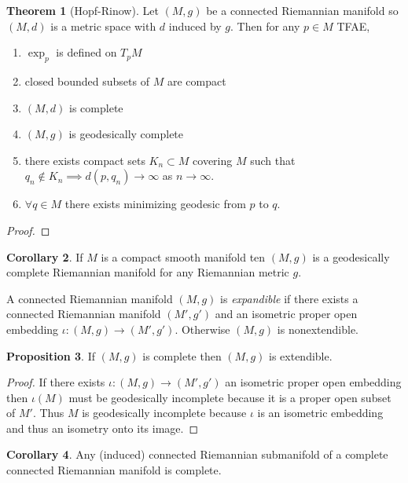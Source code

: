 \documentclass[12pt]{extarticle}
\theoremstyle{definition}
\newtheorem{theorem}{Theorem}[section]
\newtheorem{proposition}[theorem]{Proposition}
\newtheorem{corollary}[theorem]{Corollary}
\newenvironment{definition}[1][Definition:]{\begin{trivlist}
\item[\hskip \labelsep {\bfseries #1}]}{\end{trivlist}}
\begin{document}
\begin{theorem}[Hopf-Rinow]
Let $(M, g)$ be a connected Riemannian manifold so $(M, d)$ is a metric space with $d$ induced by $g$. Then for any $p \in M$ TFAE,
\begin{enumerate}
\item $\exp_p$  is defined on $T_p M$ 
\item closed bounded subsets of $M$ are compact
\item $(M, d)$ is complete
\item $(M, g)$ is geodesically  complete
\item there exists compact sets $K_n \subset M$ covering $M$ such that $q_n \notin K_n \implies d(p, q_n) \to \infty$ as $n \to \infty$.
\item $\forall q \in M$ there exists minimizing geodesic from $p$ to $q$.
\end{enumerate}
\end{theorem}

\begin{proof}

\end{proof}

\begin{corollary}
If $M$ is a compact smooth manifold ten $(M, g)$ is a geodesically complete Riemannian manifold for any Riemannian metric $g$. 
\end{corollary}

\begin{definition}
A connected Riemannian manifold $(M, g)$ is \textit{expandible} if there exists a connected Riemannian manifold $(M', g')$ and an isometric proper open embedding $\iota : (M, g) \to (M', g')$. Otherwise $(M, g)$ is nonextendible.  
\end{definition}

\begin{proposition}
If $(M, g)$ is complete then $(M, g)$ is extendible.
\end{proposition}

\begin{proof}
If there exists $\iota : (M, g) \to (M', g')$ an isometric proper open embedding then $\iota(M)$ must be geodesically incomplete because it is a proper open subset of $M'$. Thus $M$ is geodesically incomplete because $\iota$ is an isometric embedding and thus an isometry onto its image.
\end{proof}

\begin{corollary}
Any (induced) connected Riemannian submanifold of a complete connected Riemannian manifold is complete.
\end{corollary}
\end{document}
